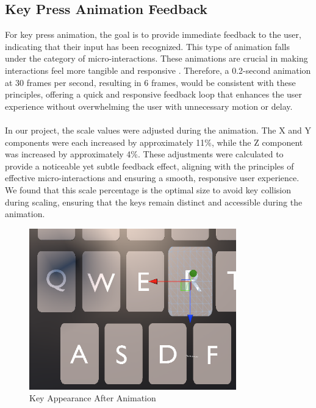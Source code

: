\subsection{Key Press Animation Feedback}
For key press animation, the goal is to provide immediate feedback to the user, indicating that their input has been recognized. This type of animation falls under the category of micro-interactions. These animations are crucial in making interactions feel more tangible and responsive \cite{Hannah2021}. Therefore, a 0.2-second animation at 30 frames per second, resulting in 6 frames, would be consistent with these principles, offering a quick and responsive feedback loop that enhances the user experience without overwhelming the user with unnecessary motion or delay.\\ \\
In our project, the scale values were adjusted during the animation. The X and Y components were each increased by approximately 11\%, while the Z component was increased by approximately 4\%. These adjustments were calculated to provide a noticeable yet subtle feedback effect, aligning with the principles of effective micro-interactions and ensuring a smooth, responsive user experience. We found that this scale percentage is the optimal size to avoid key collision during scaling, ensuring that the keys remain distinct and accessible during the animation. 
 \begin{figure}[h!]
\centering
\includegraphics[width=0.8\textwidth]{Development/key_AfterAnimation.PNG} 
\caption{Key Appearance After Animation}
\end{figure}

\noindent
\\\\                
\noindent
\\\\  \noindent
\\\\  \noindent
\\\\  \noindent



